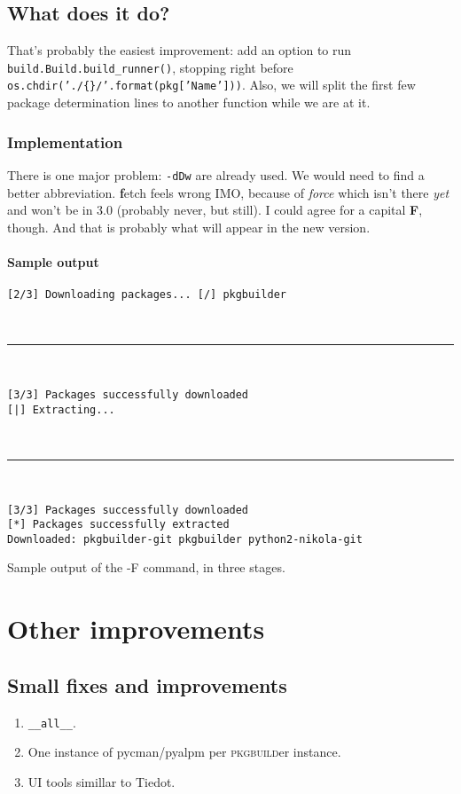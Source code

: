 \documentclass[a4paper,english]{book}
\numberwithin{equation}{section}
\newcommand{\pb}[0]{\textsc{pkgbuild}er}
\newcommand{\p}[1]{\nohyphens{\texttt{#1}}}
\begin{document}
\chapter{What does it do?}

That’s probably the easiest improvement: add an option to run \p{build.Build.build\_runner()}, stopping right before \p{os.chdir('./\{\}/'.format(pkg['Name']))}.  Also, we will split the first few package determination lines to another function while we are at it.

\section{Implementation}

There is one major problem: \p{-dDw} are already used.  We would need to find a better abbreviation.  \textbf{f}etch feels wrong IMO, because of \emph{force} which isn’t there \emph{yet} and won’t be in 3.0 (probably never, but still).  I could agree for a capital \textbf{F}, though.  And that is probably what will appear in the new version.

\subsection{Sample output}

\begin{listingf}
\begin{Verbatim}
[2/3] Downloading packages... [/] pkgbuilder
\end{Verbatim}

~

\hrule

~

\begin{Verbatim}
[3/3] Packages successfully downloaded
[|] Extracting...
\end{Verbatim}

~

\hrule

~

\begin{Verbatim}
[3/3] Packages successfully downloaded
[*] Packages successfully extracted
Downloaded: pkgbuilder-git pkgbuilder python2-nikola-git
\end{Verbatim}
\caption{Sample output of the -F command, in three stages.}
\end{listingf}

\part{Other improvements}

\chapter{Small fixes and improvements}
\begin{enumerate}
\item \p{\_\_all\_\_}.
\item One instance of pycman/pyalpm per \pb{} instance.
\item UI tools simillar to Tiedot.
\end{enumerate}
\end{document}
